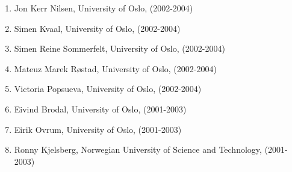 \documentclass[%
oneside,                 %
final,                   %
10pt]{article}
\begin{document}
\begin{enumerate}
\item Jon Kerr Nilsen, University of Oslo, (2002-2004)

\item Simen Kvaal, University of Oslo, (2002-2004)

\item Simen Reine Sommerfelt, University of Oslo, (2002-2004)

\item Mateuz Marek Røstad, University of Oslo, (2002-2004)

\item Victoria Popsueva, University of Oslo, (2002-2004)

\item Eivind Brodal, University of Oslo, (2001-2003)

\item Eirik Ovrum, University of Oslo, (2001-2003)

\item Ronny Kjelsberg, Norwegian University of Science and Technology, (2001-2003)
\end{enumerate}

\noindent
\end{document}
